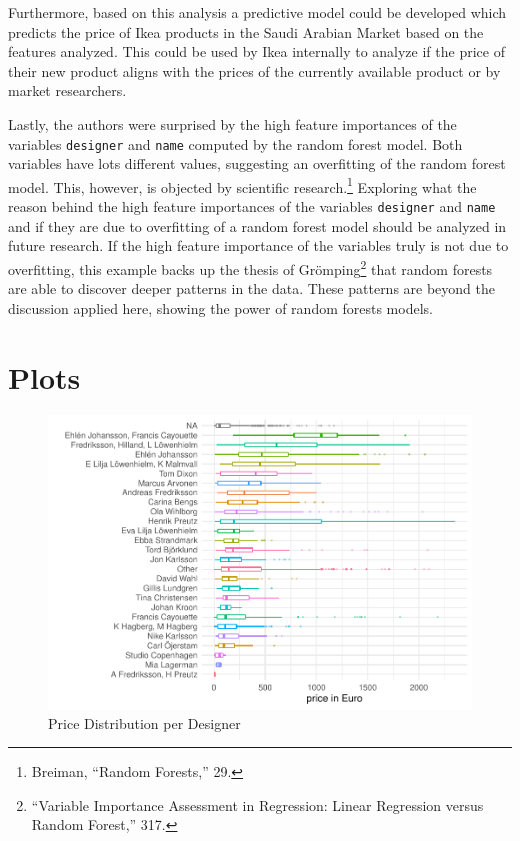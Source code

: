 \documentclass[a4paper, nobind]{templates/ociamthesis}
\begin{document}
Furthermore, based on this analysis a predictive model could be developed which predicts the price of Ikea products in the Saudi Arabian Market based on the features analyzed. This could be used by Ikea internally to analyze if the price of their new product aligns with the prices of the currently available product or by market researchers.

Lastly, the authors were surprised by the high feature importances of the variables \texttt{designer} and \texttt{name} computed by the random forest model. Both variables have lots different values, suggesting an overfitting of the random forest model. This, however, is objected by scientific research.\footnote{Breiman, ``Random Forests,'' 29.}
Exploring what the reason behind the high feature importances of the variables \texttt{designer} and \texttt{name} and if they are due to overfitting of a random forest model should be analyzed in future research.
If the high feature importance of the variables truly is not due to overfitting, this example backs up the thesis of Grömping\footnote{``Variable Importance Assessment in Regression: Linear Regression versus Random Forest,'' 317.} that random forests are able to discover deeper patterns in the data. These patterns are beyond the discussion applied here, showing the power of random forests models.

\startappendices

\hypertarget{plots}{%
\chapter{Plots}\label{plots}}

\begin{figure}
\includegraphics[width=1\linewidth]{_main_files/figure-latex/price-dist-per-designer-1} \caption{Price Distribution per Designer}\label{fig:price-dist-per-designer}
\end{figure}
\end{document}
